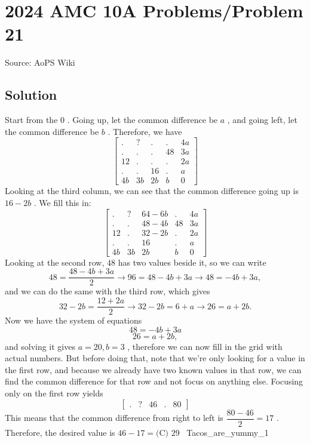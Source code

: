\documentclass[12pt]{article}
\begin{document}
\section*{{2024 AMC 10A Problems/Problem 21}}
Source: AoPS Wiki

\subsection*{Solution}
Start from the $0$ . Going up, let the common difference be $a$ , and going left, let the common difference be $b$ . Therefore, we have \[\begin{bmatrix} . & ? &.&.&4a \\ .&.&.&48&3a\\ 12&.&.&.&2a\\ .&.&16&.&a\\ 4b&3b&2b&b&0\end{bmatrix}\] Looking at the third column, we can see that the common difference going up is $16-2b$ . We fill this in: \[\begin{bmatrix} . & ? &64-6b&.&4a \\ .&.&48-4b&48&3a\\ 12&.&32-2b&.&2a\\ .&.&16&.&a\\ 4b&3b&2b&b&0\end{bmatrix}\] Looking at the second row, $48$ has two values beside it, so we can write \[48=\dfrac{48-4b+3a}{2}\rightarrow96=48-4b+3a\rightarrow48=-4b+3a,\] and we can do the same with the third row, which gives \[32-2b=\dfrac{12+2a}{2}\rightarrow32-2b=6+a\rightarrow26=a+2b.\] Now we have the system of equations \[48=-4b+3a\] \[26=a+2b,\] and solving it gives $a=20,b=3$ , therefore we can now fill in the grid with actual numbers. But before doing that, note that we're only looking for a value in the first row, and because we already have two known values in that row, we can find the common difference for that row and not focus on anything else. Focusing only on the first row yields \[\begin{bmatrix} . & ? &46&.&80\end{bmatrix}\] This means that the common difference from right to left is $\dfrac{80-46}{2}=17$ . Therefore, the desired value is $46-17=\boxed{\text{(C) }29}$ ~Tacos_are_yummy_1
\end{document}
